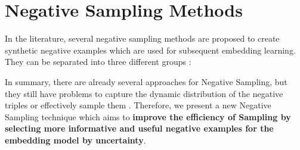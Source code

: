 \section{Negative Sampling Methods} 
\label{sec:negativesamplingmethods}

In the literature, several negative sampling methods are proposed to create synthetic negative examples which are used for subsequent embedding learning.
They can be separated into three different groups \cite{qianunderstanding}:









In summary, there are already several approaches for Negative Sampling, but they still have problems to capture the dynamic distribution of the negative triples or effectively sample them \cite{zhang2021efficient}.
Therefore, we present a new Negative Sampling technique which aims to \textbf{improve the efficiency of Sampling by selecting more informative and useful negative examples for the embedding model by uncertainty}.